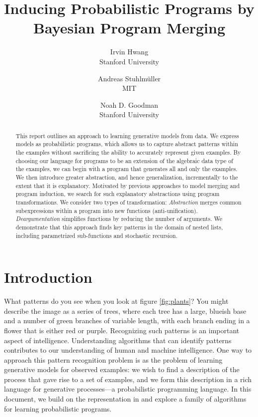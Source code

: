 \documentclass[a4paper,10pt]{article}
\begin{document}
\title{\vspace{-1.7cm}Inducing Probabilistic Programs by Bayesian Program Merging}
\author{Irvin Hwang\\Stanford University  \and Andreas Stuhlm\"{u}ller\\MIT \and Noah D. Goodman\\Stanford University}
\date{}
\maketitle
\thispagestyle{empty}
\begin{abstract}

This report outlines an approach to learning generative models from data. We express models as probabilistic programs, which allows us to capture abstract patterns within the examples without sacrificing the ability to accurately represent given examples. By choosing our language for programs to be an extension of the algebraic data type of the examples, we can begin with a program that generates all and only the examples. We then introduce greater abstraction, and hence generalization, incrementally to the extent that it is explanatory. Motivated by previous approaches to model merging and program induction, we search for such explanatory abstractions using program transformations. We consider two types of transformation: {\em Abstraction} merges common subexpressions within a program into new functions (anti-unification). {\em Deargumentation} simplifies functions by reducing the number of arguments. We demonstrate that this approach finds key patterns in the domain of nested lists, including parametrized sub-functions and stochastic recursion.

\end{abstract}

\tableofcontents

\section{Introduction}

What patterns do you see when you look at figure \ref{fig:plants}? You might describe the image as a series of trees, where each tree has a large, blueish base and a number of green branches of variable length, with each branch ending in a flower that is either red or purple. Recognizing such patterns is an important aspect of intelligence. Understanding algorithms that can identify patterns contributes to our understanding of human and machine intelligence.
One way to approach this pattern recognition problem is as the problem of learning generative models for observed examples: we wish to find a description of the process that gave rise to a set of examples, and we form this description in a rich language for generative processes---a probabilistic programming language. 
In this document, we build on the representation in \cite{A.Stuhlmueller:2010:6d11a} and explore a family of algorithms for learning probabilistic programs.
\end{document}
